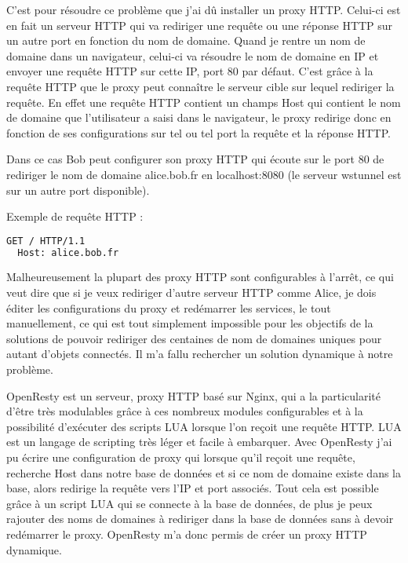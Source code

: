 C'est pour résoudre ce problème que j'ai dû installer un proxy HTTP. Celui-ci est en fait un serveur HTTP qui va rediriger une requête ou une réponse HTTP sur un autre port en fonction du nom de domaine. Quand je rentre un nom de domaine dans un navigateur, celui-ci va résoudre le nom de domaine en IP et envoyer une requête HTTP sur cette IP, port 80 par défaut. C'est grâce à la requête HTTP que le proxy peut connaître le serveur cible sur lequel rediriger la requête. En effet une requête HTTP contient un champs \og Host \fg{} qui contient le nom de domaine que l'utilisateur a saisi dans le navigateur, le proxy redirige donc en fonction de ses configurations sur tel ou tel port la requête et la réponse HTTP.

Dans ce cas Bob peut configurer son proxy HTTP qui écoute sur le port 80 de rediriger le nom de domaine \og alice.bob.fr \fg{} en \og localhost:8080 \fg{} (le serveur wstunnel est sur un autre port disponible).

\noindent Exemple de requête HTTP :
\begin{lstlisting}[language=bash]
  GET / HTTP/1.1
  Host: alice.bob.fr
\end{lstlisting}

Malheureusement la plupart des proxy HTTP sont configurables à l'arrêt, ce qui veut dire que si je veux rediriger d'autre serveur HTTP comme Alice, je dois éditer les configurations du proxy et redémarrer les services, le tout manuellement, ce qui est tout simplement impossible pour les objectifs de la solutions de pouvoir rediriger des centaines de nom de domaines uniques pour autant d'objets connectés. Il m'a fallu rechercher un solution dynamique à notre problème.

OpenResty est un serveur, proxy HTTP basé sur Nginx, qui a la particularité d'être très modulables grâce à ces nombreux modules configurables et à la possibilité d'exécuter des scripts LUA lorsque l'on reçoit une requête HTTP. LUA est un langage de scripting très léger et facile à embarquer. Avec OpenResty j'ai pu écrire une configuration de proxy qui lorsque qu'il reçoit une requête, recherche \og Host \fg{} dans notre base de données et si ce nom de domaine existe dans la base, alors redirige la requête vers l'IP et port associés. Tout cela est possible grâce à un script LUA qui se connecte à la base de données, de plus je peux rajouter des noms de domaines à rediriger dans la base de données sans à devoir redémarrer le proxy. OpenResty m'a donc permis de créer un proxy HTTP dynamique.

